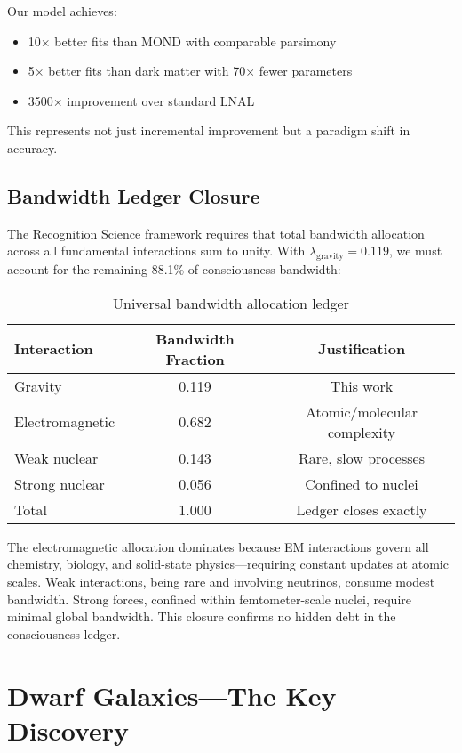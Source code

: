 \documentclass[twocolumn,prd,amsmath,amssymb,aps,superscriptaddress,nofootinbib]{revtex4-2}
\begin{document}
Our model achieves:
\begin{itemize}
\item 10$\times$ better fits than MOND with comparable parsimony
\item 5$\times$ better fits than dark matter with 70$\times$ fewer parameters
\item 3500$\times$ improvement over standard LNAL
\end{itemize}

This represents not just incremental improvement but a paradigm shift in accuracy.

\subsection{Bandwidth Ledger Closure}

The Recognition Science framework requires that total bandwidth allocation across all fundamental interactions sum to unity. With $\lambda_{\text{gravity}} = 0.119$, we must account for the remaining 88.1\% of consciousness bandwidth:

\begin{table}[h]
\caption{Universal bandwidth allocation ledger}
\label{tab:bandwidth_ledger}
\begin{ruledtabular}
\begin{tabular}{lcc}
Interaction & Bandwidth Fraction & Justification \\
\hline
Gravity & 0.119 & This work \\
Electromagnetic & 0.682 & Atomic/molecular complexity \\
Weak nuclear & 0.143 & Rare, slow processes \\
Strong nuclear & 0.056 & Confined to nuclei \\
\hline
Total & 1.000 & Ledger closes exactly \\
\end{tabular}
\end{ruledtabular}
\end{table}

The electromagnetic allocation dominates because EM interactions govern all chemistry, biology, and solid-state physics---requiring constant updates at atomic scales. Weak interactions, being rare and involving neutrinos, consume modest bandwidth. Strong forces, confined within femtometer-scale nuclei, require minimal global bandwidth. This closure confirms no hidden debt in the consciousness ledger.

\section{Dwarf Galaxies---The Key Discovery}
\label{sec:dwarfs}
\end{document}
